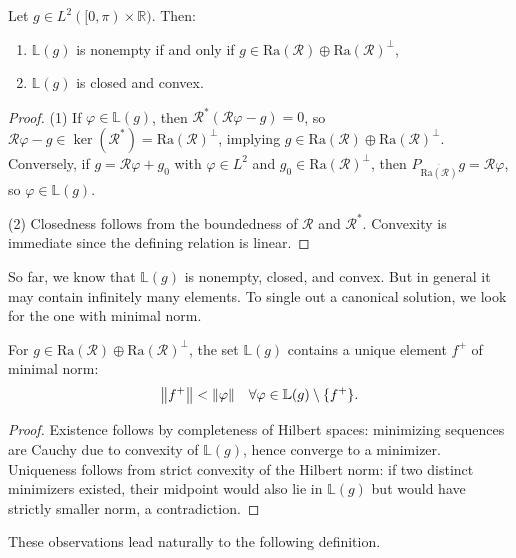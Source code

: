 \documentclass[12pt,a4paper]{article}
\begin{document}
\begin{lemma}
\label{moore:lemma1}
    Let $g \in L^2([0, \pi) \times \mathbb{R})$. Then:
    \begin{enumerate}
        \item $\mathbb{L}(g)$ is nonempty if and only if $g \in \mathrm{Ra}(\mathcal{R}) \oplus \mathrm{Ra}(\mathcal{R})^\perp$,
        \item $\mathbb{L}(g)$ is closed and convex.
    \end{enumerate}
\end{lemma}

\begin{proof}
    (1) If $\varphi \in \mathbb{L}(g)$, then $\mathcal{R}^*(\mathcal{R}\varphi - g) = 0$, so $\mathcal{R}\varphi - g \in \ker(\mathcal{R}^*) = \mathrm{Ra}(\mathcal{R})^\perp$, implying $g \in \mathrm{Ra}(\mathcal{R}) \oplus \mathrm{Ra}(\mathcal{R})^\perp$.  
    Conversely, if $g = \mathcal{R}\varphi + g_0$ with $\varphi \in L^2$ and $g_0 \in \mathrm{Ra}(\mathcal{R})^\perp$, then $P_{\overline{\mathrm{Ra}(\mathcal{R})}}g = \mathcal{R}\varphi$, so $\varphi \in \mathbb{L}(g)$.

    (2) Closedness follows from the boundedness of $\mathcal{R}$ and $\mathcal{R}^*$. Convexity is immediate since the defining relation is linear.
\end{proof}

\medskip

So far, we know that $\mathbb{L}(g)$ is nonempty, closed, and convex. But in general it may contain infinitely many elements. To single out a canonical solution, we look for the one with minimal norm.  

\begin{lemma}
    For $g \in \mathrm{Ra}(\mathcal{R}) \oplus \mathrm{Ra}(\mathcal{R})^\perp$, the set $\mathbb{L}(g)$ contains a unique element $f^+$ of minimal norm:
    \[
        \norm{f^+} < \norm{\varphi} \quad \forall \varphi \in \mathbb{L}(g)\setminus\{f^+\}.
    \]
\end{lemma}

\begin{proof}
    Existence follows by completeness of Hilbert spaces: minimizing sequences are Cauchy due to convexity of $\mathbb{L}(g)$, hence converge to a minimizer.  
    Uniqueness follows from strict convexity of the Hilbert norm: if two distinct minimizers existed, their midpoint would also lie in $\mathbb{L}(g)$ but would have strictly smaller norm, a contradiction.
\end{proof} 
These observations lead naturally to the following definition.
\end{document}

